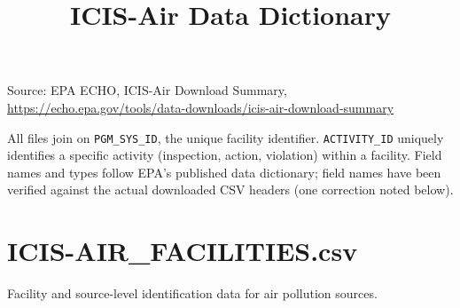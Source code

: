 \documentclass[11pt]{article}
\title{ICIS-Air Data Dictionary}
\author{}
\date{}
\begin{document}
\maketitle

\noindent Source: EPA ECHO, ICIS-Air Download Summary,
\url{https://echo.epa.gov/tools/data-downloads/icis-air-download-summary}

\medskip
\noindent All files join on \texttt{PGM\_SYS\_ID}, the unique facility identifier. \texttt{ACTIVITY\_ID}
uniquely identifies a specific activity (inspection, action, violation) within a facility. Field names
and types follow EPA's published data dictionary; field names have been verified against the actual
downloaded CSV headers (one correction noted below).

\section*{ICIS-AIR\_FACILITIES.csv}
Facility and source-level identification data for air pollution sources.
\end{document}
